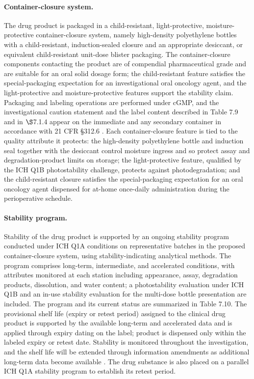 \paragraph{Container-closure system.}
The drug product is packaged in a child-resistant, light-protective,
moisture-protective container-closure system, namely high-density polyethylene
bottles with a child-resistant, induction-sealed closure and an appropriate
desiccant, or equivalent child-resistant unit-dose blister packaging. The
container-closure components contacting the product are of compendial
pharmaceutical grade and are suitable for an oral solid dosage form; the
child-resistant feature satisfies the special-packaging expectation for an
investigational oral oncology agent, and the light-protective and
moisture-protective features support the stability claim. Packaging and labeling
operations are performed under cGMP, and the investigational caution statement and
the label content described in Table 7.9 and in $\S$7.1.4 appear on the immediate
and any secondary container in accordance with 21 CFR \S 312.6 \cite{phase1guidance}.
Each container-closure feature is tied to the quality attribute it protects: the
high-density polyethylene bottle and induction seal together with the desiccant
control moisture ingress and so protect assay and degradation-product limits on
storage; the light-protective feature, qualified by the ICH Q1B photostability
challenge, protects against photodegradation; and the child-resistant closure
satisfies the special-packaging expectation for an oral oncology agent dispensed
for at-home once-daily administration during the perioperative schedule.

\paragraph{Stability program.}
Stability of the drug product is supported by an ongoing stability program
conducted under ICH Q1A conditions on representative batches in the proposed
container-closure system, using stability-indicating analytical methods. The
program comprises long-term, intermediate, and accelerated conditions, with
attributes monitored at each station including appearance, assay, degradation
products, dissolution, and water content; a photostability evaluation under ICH
Q1B and an in-use stability evaluation for the multi-dose bottle presentation are
included. The program and its current status are summarized in Table 7.10. The
provisional shelf life (expiry or retest period) assigned to the clinical drug
product is supported by the available long-term and accelerated data and is
applied through expiry dating on the label; product is dispensed only within the
labeled expiry or retest date. Stability is monitored throughout the
investigation, and the shelf life will be extended through information amendments
as additional long-term data become available \cite{phase1guidance}. The drug
substance is also placed on a parallel ICH Q1A stability program to establish its
retest period. 

